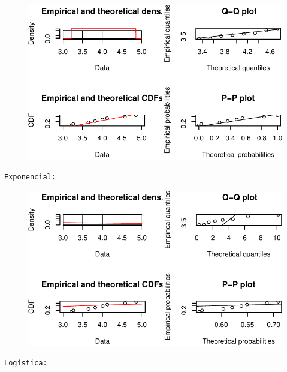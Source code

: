 \documentclass[
  letterpaper,
  DIV=11,
  numbers=noendperiod]{scrartcl}
\begin{document}
\begin{figure}[H]

{\centering \includegraphics{quiz5_files/figure-pdf/unnamed-chunk-39-7.pdf}

}

\end{figure}

\begin{verbatim}
Exponencial: 
\end{verbatim}

\begin{figure}[H]

{\centering \includegraphics{quiz5_files/figure-pdf/unnamed-chunk-39-8.pdf}

}

\end{figure}

\begin{verbatim}
Logística: 
\end{verbatim}
\end{document}

